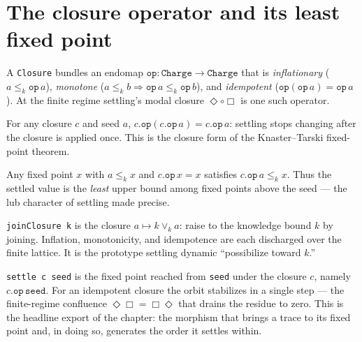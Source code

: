 \section{The closure operator and its least fixed point}
\begin{proposition}\label{thm:closure-operator}\leanok{}
A \texttt{Closure} bundles an endomap $\texttt{op}:\texttt{Charge}\to\texttt{Charge}$
that is \emph{inflationary} ($a \le_k \texttt{op}\,a$), \emph{monotone}
($a \le_k b \Rightarrow \texttt{op}\,a \le_k \texttt{op}\,b$), and
\emph{idempotent} ($\texttt{op}(\texttt{op}\,a) = \texttt{op}\,a$). At the finite
regime settling's modal closure $\Diamond\circ\Box$ is one such operator.
\end{proposition}
\begin{theorem}\label{thm:op-fixed}\leanok{}
For any closure $c$ and seed $a$, $c.\texttt{op}(c.\texttt{op}\,a) =
c.\texttt{op}\,a$: settling stops changing after the closure is applied once.
This is the closure form of the Knaster--Tarski fixed-point theorem.
\end{theorem}
\begin{theorem}\label{thm:op-least}\leanok{}
Any fixed point $x$ with $a \le_k x$ and $c.\texttt{op}\,x = x$ satisfies
$c.\texttt{op}\,a \le_k x$. Thus the settled value is the \emph{least} upper
bound among fixed points above the seed --- the lub character of settling made
precise.
\end{theorem}
\begin{proposition}\label{thm:join-closure}\leanok{}
\texttt{joinClosure k} is the closure $a \mapsto k \vee_k a$: raise to the
knowledge bound $k$ by joining. Inflation, monotonicity, and idempotence are
each discharged over the finite lattice. It is the prototype settling dynamic
``possibilize toward $k$.''
\end{proposition}
\begin{proposition}[Settling]\label{thm:settling}\leanok{}
\texttt{settle c seed} is the fixed point reached from \texttt{seed} under the
closure $c$, namely $c.\texttt{op}\,\texttt{seed}$. For an idempotent closure the
orbit stabilizes in a single step --- the finite-regime confluence
$\Diamond\Box = \Box\Diamond$ that drains the residue to zero. This is the
headline export of the chapter: the morphism that brings a trace to its fixed
point and, in doing so, generates the order it settles within.
\end{proposition}
